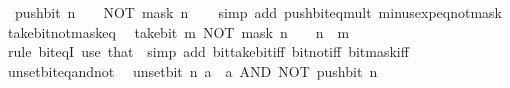 \begin{isabellebody}
\ \ {\isacartoucheopen}push{\isacharunderscore}{\kern0pt}bit\ n\ {\isacharparenleft}{\kern0pt}{\isacharminus}{\kern0pt}\ {}{\isacharparenright}{\kern0pt}\ {\isacharequal}{\kern0pt}\ NOT\ {\isacharparenleft}{\kern0pt}mask\ n{\isacharparenright}{\kern0pt}{\isacartoucheclose}\isanewline
%
\isadelimproof
\ \ %
\endisadelimproof
%
\isatagproof
{}\isamarkupfalse%
\ {\isacharparenleft}{\kern0pt}simp\ add{\isacharcolon}{\kern0pt}\ push{\isacharunderscore}{\kern0pt}bit{\isacharunderscore}{\kern0pt}eq{\isacharunderscore}{\kern0pt}mult\ minus{\isacharunderscore}{\kern0pt}exp{\isacharunderscore}{\kern0pt}eq{\isacharunderscore}{\kern0pt}not{\isacharunderscore}{\kern0pt}mask{\isacharparenright}{\kern0pt}%
\endisatagproof
{\isafoldproof}%
%
\isadelimproof
\isanewline
%
\endisadelimproof
\isanewline
{}\isamarkupfalse%
\ take{\isacharunderscore}{\kern0pt}bit{\isacharunderscore}{\kern0pt}not{\isacharunderscore}{\kern0pt}mask{\isacharunderscore}{\kern0pt}eq{\isacharunderscore}{\kern0pt}{}{\isacharcolon}{\kern0pt}\isanewline
\ \ {\isacartoucheopen}take{\isacharunderscore}{\kern0pt}bit\ m\ {\isacharparenleft}{\kern0pt}NOT\ {\isacharparenleft}{\kern0pt}mask\ n{\isacharparenright}{\kern0pt}{\isacharparenright}{\kern0pt}\ {\isacharequal}{\kern0pt}\ {}{\isacartoucheclose}\ \ {\isacartoucheopen}n\ {\isasymge}\ m{\isacartoucheclose}\isanewline
%
\isadelimproof
\ \ %
\endisadelimproof
%
\isatagproof
{}\isamarkupfalse%
\ {\isacharparenleft}{\kern0pt}rule\ bit{\isacharunderscore}{\kern0pt}eqI{\isacharparenright}{\kern0pt}\ {\isacharparenleft}{\kern0pt}use\ that\ \ {\isacartoucheopen}simp\ add{\isacharcolon}{\kern0pt}\ bit{\isacharunderscore}{\kern0pt}take{\isacharunderscore}{\kern0pt}bit{\isacharunderscore}{\kern0pt}iff\ bit{\isacharunderscore}{\kern0pt}not{\isacharunderscore}{\kern0pt}iff\ bit{\isacharunderscore}{\kern0pt}mask{\isacharunderscore}{\kern0pt}iff{\isacartoucheclose}{\isacharparenright}{\kern0pt}%
\endisatagproof
{\isafoldproof}%
%
\isadelimproof
\isanewline
%
\endisadelimproof
\isanewline
{}\isamarkupfalse%
\ unset{\isacharunderscore}{\kern0pt}bit{\isacharunderscore}{\kern0pt}eq{\isacharunderscore}{\kern0pt}and{\isacharunderscore}{\kern0pt}not{\isacharcolon}{\kern0pt}\isanewline
\ \ {\isacartoucheopen}unset{\isacharunderscore}{\kern0pt}bit\ n\ a\ {\isacharequal}{\kern0pt}\ a\ AND\ NOT\ {\isacharparenleft}{\kern0pt}push{\isacharunderscore}{\kern0pt}bit\ n\ {}{\isacharparenright}{\kern0pt}{\isacartoucheclose}\isanewline
%
\isadelimproof
\ \ %

\end{isabellebody}
